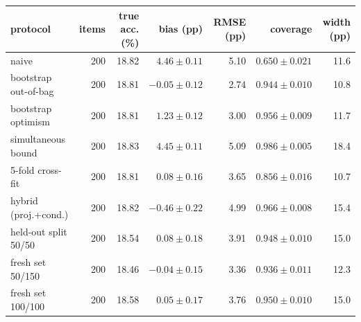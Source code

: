 {\footnotesize\setlength{\tabcolsep}{3.5pt}
\begin{tabular}{lrrrrrr}
\toprule
protocol & items & true acc. (\%) & bias (pp) & RMSE (pp) & coverage & width (pp) \\
\midrule
naive & 200 & 18.82 & $4.46 \pm 0.11$ & 5.10 & $0.650 \pm 0.021$ & 11.6 \\
bootstrap out-of-bag & 200 & 18.81 & $-0.05 \pm 0.12$ & 2.74 & $0.944 \pm 0.010$ & 10.8 \\
bootstrap optimism & 200 & 18.81 & $1.23 \pm 0.12$ & 3.00 & $0.956 \pm 0.009$ & 11.7 \\
simultaneous bound & 200 & 18.83 & $4.45 \pm 0.11$ & 5.09 & $0.986 \pm 0.005$ & 18.4 \\
5-fold cross-fit & 200 & 18.81 & $0.08 \pm 0.16$ & 3.65 & $0.856 \pm 0.016$ & 10.7 \\
hybrid (proj.+cond.) & 200 & 18.82 & $-0.46 \pm 0.22$ & 4.99 & $0.966 \pm 0.008$ & 15.4 \\
held-out split 50/50 & 200 & 18.54 & $0.08 \pm 0.18$ & 3.91 & $0.948 \pm 0.010$ & 15.0 \\
fresh set 50/150 & 200 & 18.46 & $-0.04 \pm 0.15$ & 3.36 & $0.936 \pm 0.011$ & 12.3 \\
fresh set 100/100 & 200 & 18.58 & $0.05 \pm 0.17$ & 3.76 & $0.950 \pm 0.010$ & 15.0 \\
\bottomrule
\end{tabular}}

